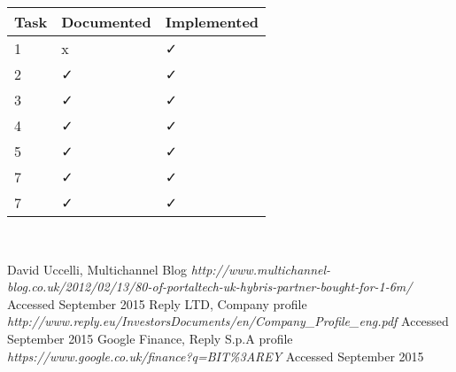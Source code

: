 \documentclass[titlepage]{article}
\begin{document}
 \begin{tabularx}{0.8\columnwidth}{| X | X | X |}
            \hline
            Task & Documented & Implemented \\
            \hline
            1 & x & ✓ \\
            \hline
            2 & ✓ & ✓ \\
            \hline
            3 & ✓ & ✓ \\
            \hline
            4 & ✓ & ✓ \\
            \hline
            5 & ✓ & ✓ \\
            \hline
            7 & ✓ & ✓ \\
            \hline
            7 & ✓ & ✓ \\
            \hline
        \end{tabularx} \\



 \begin{thebibliography}{1}
 	
 	 David Uccelli, Multichannel Blog {\em http://www.multichannel-blog.co.uk/2012/02/13/80-of-portaltech-uk-hybris-partner-bought-for-1-6m/} Accessed September 2015
 	 Reply LTD, Company profile {\em http://www.reply.eu/InvestorsDocuments/en/Company\_Profile\_eng.pdf} Accessed September 2015
 	 Google Finance, Reply S.p.A profile {\em https://www.google.co.uk/finance?q=BIT\%3AREY} Accessed September 2015
 	
 	
 	
 	
 		

	


 \end{thebibliography}
\end{document}
